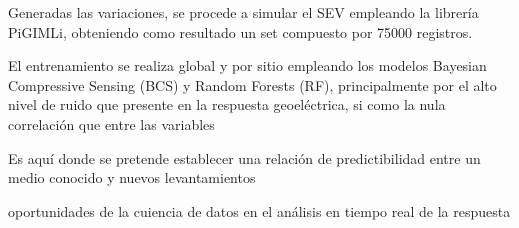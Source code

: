 Generadas las variaciones, se procede a simular el SEV empleando la librería PiGIMLi, obteniendo como resultado un set compuesto por 75000 registros. 

El entrenamiento se realiza global y por sitio empleando los modelos Bayesian Compressive Sensing (BCS) y Random Forests (RF), principalmente por el alto nivel de ruido que presente en la respuesta geoeléctrica, si como la nula correlación que entre las variables



















Es aquí donde se pretende establecer una relación de predictibilidad entre un medio conocido y nuevos levantamientos
 


oportunidades de la cuiencia de datos en el análisis en tiempo real de la respuesta 




